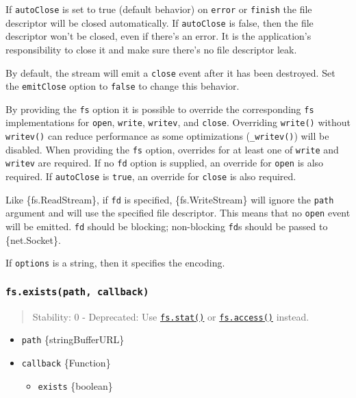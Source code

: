 If \texttt{autoClose} is set to true (default behavior) on
\texttt{\textquotesingle{}error\textquotesingle{}} or
\texttt{\textquotesingle{}finish\textquotesingle{}} the file descriptor
will be closed automatically. If \texttt{autoClose} is false, then the
file descriptor won't be closed, even if there's an error. It is the
application's responsibility to close it and make sure there's no file
descriptor leak.

By default, the stream will emit a
\texttt{\textquotesingle{}close\textquotesingle{}} event after it has
been destroyed. Set the \texttt{emitClose} option to \texttt{false} to
change this behavior.

By providing the \texttt{fs} option it is possible to override the
corresponding \texttt{fs} implementations for \texttt{open},
\texttt{write}, \texttt{writev}, and \texttt{close}. Overriding
\texttt{write()} without \texttt{writev()} can reduce performance as
some optimizations (\texttt{\_writev()}) will be disabled. When
providing the \texttt{fs} option, overrides for at least one of
\texttt{write} and \texttt{writev} are required. If no \texttt{fd}
option is supplied, an override for \texttt{open} is also required. If
\texttt{autoClose} is \texttt{true}, an override for \texttt{close} is
also required.

Like \{fs.ReadStream\}, if \texttt{fd} is specified, \{fs.WriteStream\}
will ignore the \texttt{path} argument and will use the specified file
descriptor. This means that no
\texttt{\textquotesingle{}open\textquotesingle{}} event will be emitted.
\texttt{fd} should be blocking; non-blocking \texttt{fd}s should be
passed to \{net.Socket\}.

If \texttt{options} is a string, then it specifies the encoding.

\subsubsection{\texorpdfstring{\texttt{fs.exists(path,\ callback)}}{fs.exists(path, callback)}}\label{fs.existspath-callback}

\begin{quote}
Stability: 0 - Deprecated: Use
\hyperref[fsstatpath-options-callback]{\texttt{fs.stat()}} or
\hyperref[fsaccesspath-mode-callback]{\texttt{fs.access()}} instead.
\end{quote}

\begin{itemize}
\tightlist
\item
  \texttt{path} \{string\textbar Buffer\textbar URL\}
\item
  \texttt{callback} \{Function\}

  \begin{itemize}
  \tightlist
  \item
    \texttt{exists} \{boolean\}
  \end{itemize}
\end{itemize}

